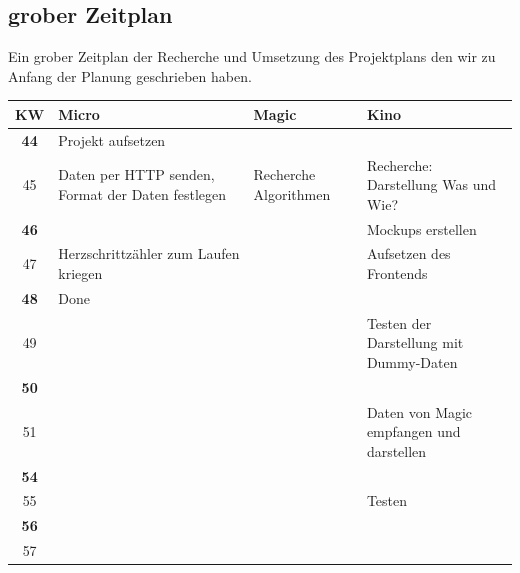 \documentclass[a4paper, 11pt]{article}
\begin{document}
\subsection{grober Zeitplan}
Ein grober Zeitplan der Recherche und Umsetzung des Projektplans den wir zu Anfang der Planung geschrieben haben.
\begin{center}
    \begin{tabularx}{\textwidth}{ |c|X|X|X| }
        \hline
        \textbf{KW} & \textbf{Micro}                                    & \textbf{Magic}        & \textbf{Kino}                            \\
        \hline
        \textbf{44} & Projekt aufsetzen                                 &                       &                                          \\
        \hline
        45          & Daten per HTTP senden, Format der Daten festlegen & Recherche Algorithmen & Recherche: Darstellung Was und Wie?      \\
        \hline
        \textbf{46} &                                                   &                       & Mockups erstellen                        \\
        \hline
        47          & Herzschrittzähler zum Laufen kriegen              &                       & Aufsetzen des Frontends                  \\
        \hline
        \textbf{48} & Done                                              &                       &                                          \\
        \hline
        49          &                                                   &                       & Testen der Darstellung mit Dummy-Daten   \\
        \hline
        \textbf{50} &                                                   &                       &                                          \\
        \hline
        51          &                                                   &                       & Daten von Magic empfangen und darstellen \\
        \hline
        \textbf{54} &                                                   &                       &                                          \\
        \hline
        55          &                                                   &                       & Testen                                   \\
        \hline
        \textbf{56} &                                                   &                       &                                          \\
        \hline
        57          &                                                   &                       &                                          \\
        \hline
    \end{tabularx}
\end{center}
\end{document}
